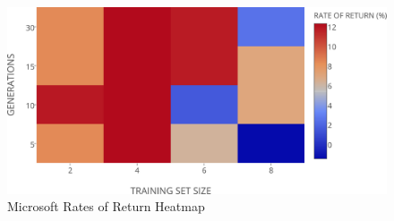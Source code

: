 \documentclass[12pt,journal,draftcls,onecolumn]{IEEEtran}
\begin{document}
\begin{figure}[htp]
\caption{Microsoft Rates of Return Heatmap}
\label{msft-ror-heatmap}
\begin{center}
\includegraphics[width=0.5\columnwidth]{figures/rates-of-return-msft-heatmap/rates-of-return-msft-heatmap.png}
\end{center}
\end{figure}

\clearpage


\end{document}
